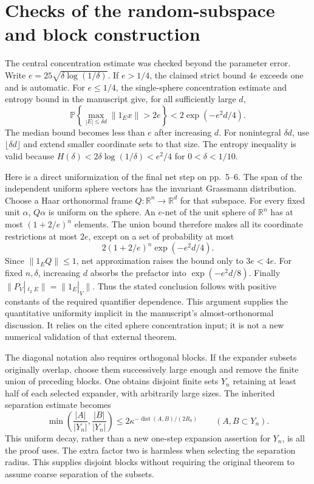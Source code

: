 \documentclass[10pt]{article}
\begin{document}
\section*{Checks of the random-subspace and block construction}
The central concentration estimate was checked beyond the parameter error. Write \(e=25\sqrt{\delta\log(1/\delta)}\). If \(e>1/4\), the claimed strict bound \(4e\) exceeds one and is automatic. For \(e\le1/4\), the single-sphere concentration estimate and entropy bound in the manuscript give, for all sufficiently large \(d\), \[{\mathbb P}\left\{\max_{|E|\le\delta d}\|1_E x\|>2e\right\}
 <2\exp(-e^2d/4).\] The median bound becomes less than \(e\) after increasing \(d\). For nonintegral \(\delta d\), use \(\lfloor\delta d\rfloor\) and extend smaller coordinate sets to that size. The entropy inequality is valid because \(H(\delta)<2\delta\log(1/\delta)<e^2/4\) for \(0<\delta<1/10\).\par
Here is a direct uniformization of the final net step on pp. 5–6. The span of the independent uniform sphere vectors has the invariant Grassmann distribution. Choose a Haar orthonormal frame \(Q:\mathbb R^n\to\mathbb R^d\) for that subspace. For every fixed unit \(\alpha\), \(Q\alpha\) is uniform on the sphere. An \(e\)-net of the unit sphere of \(\mathbb R^n\) has at most \((1+2/e)^n\) elements. The union bound therefore makes all its coordinate restrictions at most \(2e\), except on a set of probability at most \[2(1+2/e)^n\exp(-e^2d/4).\] Since \(\|1_EQ\|\le1\), net approximation raises the bound only to \(3e<4e\). For fixed \(n,\delta\), increasing \(d\) absorbs the prefactor into \(\exp(-e^2d/8)\). Finally \(\|P_V|_{\ell_2E}\|=\|1_E|_V\|\). Thus the stated conclusion follows with positive constants of the required quantifier dependence. This argument supplies the quantitative uniformity implicit in the manuscript’s almost-orthonormal discussion. It relies on the cited sphere concentration input; it is not a new numerical validation of that external theorem.\par
The diagonal notation also requires orthogonal blocks. If the expander subsets originally overlap, choose them successively large enough and remove the finite union of preceding blocks. One obtains disjoint finite sets \(Y_n\) retaining at least half of each selected expander, with arbitrarily large sizes. The inherited separation estimate becomes \[\min\!\left(\frac{|A|}{|Y_n|},\frac{|B|}{|Y_n|}\right)
 \le 2\kappa^{-\operatorname{dist}(A,B)/(2R_0)}
 \qquad(A,B\subset Y_n).\] This uniform decay, rather than a new one-step expansion assertion for \(Y_n\), is all the proof uses. The extra factor two is harmless when selecting the separation radius. This supplies disjoint blocks without requiring the original theorem to assume coarse separation of the subsets.\par
\end{document}
